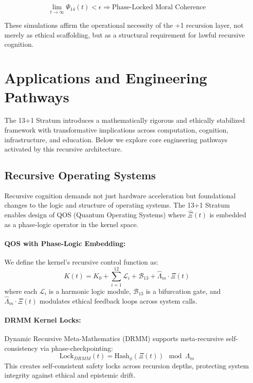 \documentclass[12pt]{article}
\begin{document}
\[
\lim_{t \to \infty} \Psi_{14}(t) < \epsilon \Rightarrow \text{Phase-Locked Moral Coherence}
\]

These simulations affirm the operational necessity of the +1 recursion layer, not merely as ethical scaffolding, but as a structural requirement for lawful recursive cognition.

\section{Applications and Engineering Pathways}

The 13+1 Stratum introduces a mathematically rigorous and ethically stabilized framework with transformative implications across computation, cognition, infrastructure, and education. Below we explore core engineering pathways activated by this recursive architecture.

\subsection{Recursive Operating Systems}

Recursive cognition demands not just hardware acceleration but foundational changes to the logic and structure of operating systems. The 13+1 Stratum enables design of QOS (Quantum Operating Systems) where $\hat{\Xi}(t)$ is embedded as a phase-logic operator in the kernel space.

\paragraph{QOS with Phase-Logic Embedding:}
We define the kernel's recursive control function as:
\[
K(t) = K_0 + \sum_{i=1}^{12} \mathcal{L}_i + \mathcal{B}_{13} + \hat{\Lambda}_m \cdot \Xî(t)
\]
where each $\mathcal{L}_i$ is a harmonic logic module, $\mathcal{B}_{13}$ is a bifurcation gate, and $\hat{\Lambda}_m \cdot \Xî(t)$ modulates ethical feedback loops across system calls.

\paragraph{DRMM Kernel Locks:}
Dynamic Recursive Meta-Mathematics (DRMM) supports meta-recursive self-consistency via phase-checkpointing:
\[
\text{Lock}_{DRMM}(t) = \text{Hash}_\phi(\Xî(t)) \mod \Lambda_m
\]
This creates self-consistent safety locks across recursion depths, protecting system integrity against ethical and epistemic drift.
\end{document}
